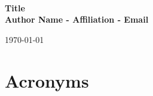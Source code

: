 \documentclass[a4paper,12pt]{article}
\begin{document}

~\\[3.5cm]

\begin{center}

{\huge \bfseries
    Title
}\\[0.5cm]

\textbf{Author Name - Affiliation - Email}\\[2.5cm]


\begin{abstract}
{\it
    Nice abstract.

    With amazingly clear and concise paper description.

    Compilation date at the bottom of the page if required.
}
\end{abstract}

\end{center}


\vfill
\centerline{\large \today}




\newpage
\tableofcontents
\newpage
















\printbibliography


\appendix

\section{Acronyms}
\label{sec:Acronyms}
\end{document}
